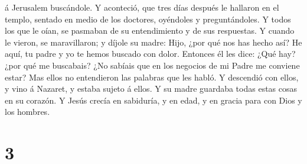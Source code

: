 á Jerusalem buscándole.  Y aconteció, que tres días después
le hallaron en el templo, sentado en medio de los doctores, oyéndoles y
preguntándoles.  Y todos los que le oían, se pasmaban de su
entendimiento y de sus respuestas.  Y cuando le vieron, se
maravillaron; y díjole su madre: Hijo, ¿por qué nos has hecho así? He
aquí, tu padre y yo te hemos buscado con dolor.  Entonces
él les dice: ¿Qué hay? ¿por qué me buscabais? ¿No sabíais que en los
negocios de mi Padre me conviene estar?  Mas ellos no
entendieron las palabras que les habló.  Y descendió con
ellos, y vino á Nazaret, y estaba sujeto á ellos. Y su madre guardaba
todas estas cosas en su corazón.  Y Jesús crecía en
sabiduría, y en edad, y en gracia para con Dios y los hombres.

\hypertarget{section-2}{%
\section{3}\label{section-2}}

